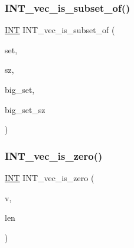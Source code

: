 \mbox{\label{sorting_8_c_a20ec6b8d7632de228f6a41317ee56be3}} 
\subsubsection{\texorpdfstring{I\+N\+T\+\_\+vec\+\_\+is\+\_\+subset\+\_\+of()}{INT\_vec\_is\_subset\_of()}}
{\footnotesize\ttfamily \mbox{\hyperlink{galois_8h_a09fddde158a3a20bd2dcadb609de11dc}{I\+NT}} I\+N\+T\+\_\+vec\+\_\+is\+\_\+subset\+\_\+of (\begin{DoxyParamCaption}\item[{\mbox{\hyperlink{galois_8h_a09fddde158a3a20bd2dcadb609de11dc}{I\+NT}} $\ast$}]{set,  }\item[{\mbox{\hyperlink{galois_8h_a09fddde158a3a20bd2dcadb609de11dc}{I\+NT}}}]{sz,  }\item[{\mbox{\hyperlink{galois_8h_a09fddde158a3a20bd2dcadb609de11dc}{I\+NT}} $\ast$}]{big\+\_\+set,  }\item[{\mbox{\hyperlink{galois_8h_a09fddde158a3a20bd2dcadb609de11dc}{I\+NT}}}]{big\+\_\+set\+\_\+sz }\end{DoxyParamCaption})}

\mbox{\label{sorting_8_c_acfa3be3f07348e1f24254c1c04ff2b4a}} 
\subsubsection{\texorpdfstring{I\+N\+T\+\_\+vec\+\_\+is\+\_\+zero()}{INT\_vec\_is\_zero()}}
{\footnotesize\ttfamily \mbox{\hyperlink{galois_8h_a09fddde158a3a20bd2dcadb609de11dc}{I\+NT}} I\+N\+T\+\_\+vec\+\_\+is\+\_\+zero (\begin{DoxyParamCaption}\item[{\mbox{\hyperlink{galois_8h_a09fddde158a3a20bd2dcadb609de11dc}{I\+NT}} $\ast$}]{v,  }\item[{\mbox{\hyperlink{galois_8h_a09fddde158a3a20bd2dcadb609de11dc}{I\+NT}}}]{len }\end{DoxyParamCaption})}

